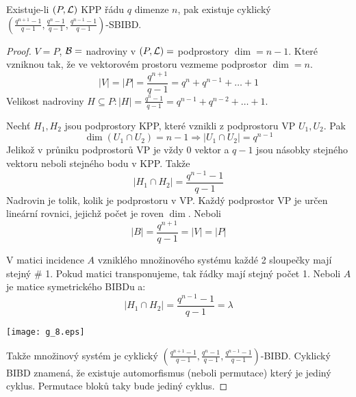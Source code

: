 \begin{theorem}
    Existuje-li $(P,\operatorname{\mathcal{L}})$ KPP řádu $q$ dimenze $n$, pak existuje cyklický $(\frac{q^{n+1}-1}{q-1},\frac{q^n-1}{q-1},\frac{q^{n-1}-1}{q-1})$-SBIBD.
\end{theorem}
\begin{proof}
	$V = P$, $\operatorname{\mathcal{B}} = $ nadroviny v $(P, \operatorname{\mathcal{L}}) = $ podprostory $\dim = n - 1$.
	Které vzniknou tak, že ve vektorovém prostoru vezmeme podprostor $\dim = n$.
	\[ |V| = |P| = \frac{q^{n + 1}}{q - 1} = q^n + q^{n - 1} + \ldots + 1 \]
	Velikost nadroviny $H \subseteq P: |H| = \frac{q^n - 1}{q - 1} = q^{n - 1} + q^{n - 2} + \ldots + 1$.

	Nechť $H_1, H_2$ jsou podprostory KPP, které vznikli z podprostoru VP $U_1, U_2$.
	Pak
	\[ \dim(U_1 \cap U_2) = n - 1 \Rightarrow |U_1 \cap U_2| = q^{n - 1} \]
	Jelikož v průniku podprostorů VP je vždy 0 vektor a $q - 1$ jsou násobky stejného vektoru neboli stejného bodu v KPP.
	Takže
	\[ |H_1 \cap H_2| = \frac{q^{n - 1} - 1}{q - 1} \]
	Nadrovin je tolik, kolik je podprostoru v VP.
	Každý podprostor VP je určen lineární rovnici, jejichž počet je roven $\dim$.
	Neboli
	\[ |B| = \frac{q^{n + 1}}{q - 1} = |V| = |P| \]

	V matici incidence $A$ vzniklého množinového systému každé 2 sloupečky mají stejný \# 1.
	Pokud matici transponujeme, tak řádky mají stejný počet 1.
	Neboli $A$ je matice symetrického BIBDu a:
	\[ |H_1 \cap H_2| = \frac{q^{n - 1} - 1}{q - 1} = \lambda \]

    	\texttt{[image: g\_8.eps]}

	Takže množinový systém je cyklický $(\frac{q^{n+1}-1}{q-1},\frac{q^n-1}{q-1},\frac{q^{n-1}-1}{q-1})$-BIBD.
	Cyklický BIBD znamená, že existuje automorfismus (neboli permutace) který je jediný cyklus.
	Permutace bloků taky bude jediný cyklus.
\end{proof}


